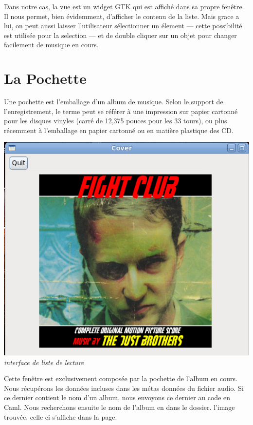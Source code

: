 \documentclass[12pt,a4paper]{report}
\begin{document}
Dans notre cas, la vue est un widget GTK qui est affiché dans sa propre fenêtre. Il nous permet, bien évidemment, d'afficher le contenu de la liste. Mais grace a lui, on peut aussi laisser l'utilisateur sélectionner un élement --- cette possibilité est utilisée pour la selection --- et de double cliquer sur un objet pour changer facilement de musique en cours.\\

\chapter{La Pochette}

Une pochette est l'emballage d'un album de musique. Selon le support de l'enregistrement, le terme peut se référer à une impression sur papier cartonné pour les disques vinyles (carré de 12,375 pouces pour les 33 tours), ou plus récemment à l'emballage en papier cartonné ou en matière plastique des CD.

\begin{center}
\includegraphics[scale=0.7]{cover.png}
\it{interface de liste de lecture}
\end{center}

Cette fenêtre est exclusivement composée par la pochette de l'album en cours.
Nous récupérons les données incluses dans les métas données du fichier audio. 
Si ce dernier contient le nom d'un album, nous envoyons ce dernier au code en Caml. 
Nous recherchons ensuite le nom de l'album en dans le dossier. l'image trouvée, celle ci s'affiche dans la page.
\end{document}
